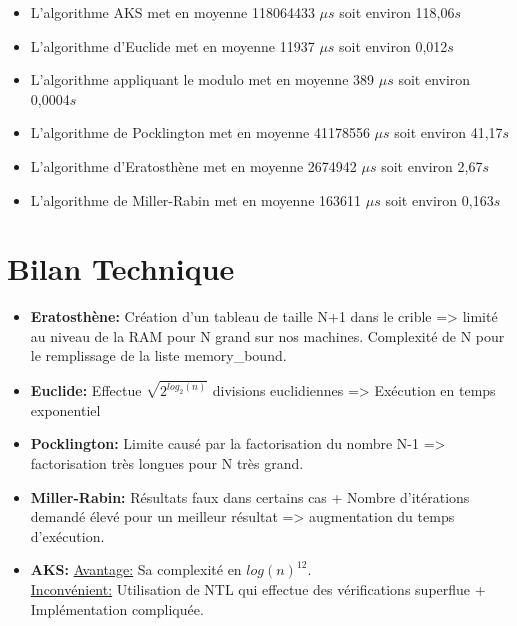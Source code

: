 	\begin{frame}
\begin{itemize}
	\item L'algorithme AKS met en moyenne 118064433 $\mu s$ soit environ 118,06$s$
	\item L'algorithme d'Euclide met en moyenne 11937 $\mu s$ soit environ 0,012$s$
	\item L'algorithme appliquant le modulo met en moyenne 389 $\mu s$ soit environ 0,0004$s$
	\item L'algorithme de Pocklington met en moyenne 41178556 $\mu s$ soit environ 41,17$s$
	\item L'algorithme d'Eratosthène met en moyenne 2674942 $\mu s$ soit environ 2,67$s$
	\item L'algorithme de Miller-Rabin met en moyenne 163611 $\mu s$ soit environ 0,163$s$
\end{itemize}
	\end{frame}

	\section{Bilan Technique}
		\begin{frame}
			\begin{itemize}
			\item \textbf{Eratosthène:} Création d'un tableau de taille N+1 dans le crible => limité au niveau de la RAM pour N grand sur nos machines. Complexité de N pour le remplissage de la liste memory\_bound. \\
			\vspace{1em}			
			\item \textbf{Euclide:} Effectue $\sqrt{2^{log_2(n)}}$ divisions euclidiennes => Exécution en temps exponentiel\\
			\vspace{1em}
			\item \textbf{Pocklington:} Limite causé par la factorisation du nombre N-1 => factorisation très longues pour N très grand.\\
			\vspace{1em}
			\item \textbf{Miller-Rabin:} Résultats faux dans certains cas + Nombre d'itérations demandé élevé pour un meilleur résultat => augmentation du temps d'exécution.  \\
			\vspace{1em}
			\item \textbf{AKS:} \underline{Avantage:} Sa complexité en $log(n)^{12}$.\\
						\underline{Inconvénient:} Utilisation de NTL qui effectue des vérifications superflue + Implémentation compliquée.\\
			
			\end{itemize}	
			\end{frame}
		
